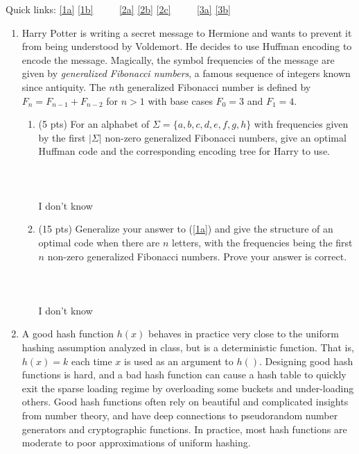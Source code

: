 \documentclass[12pt]{article}
\begin{document}
\renewcommand{\headrulewidth}{0.5pt}
\phantom{Test}

Quick links: \ref{1a} \ref{1b} $\qquad$ \ref{2a} \ref{2b} \ref{2c} $\qquad$ \ref{3a} \ref{3b} 
\vspace{-3mm}

\vspace{-3mm}
\begin{enumerate}
		 
	\item Harry Potter is writing a secret message to Hermione and wants to prevent it from being understood by Voldemort. He decides to use Huffman encoding to encode the message. Magically, the symbol frequencies of the message are given by \textit{generalized Fibonacci numbers}, a famous sequence of integers known since antiquity. The $n$th generalized Fibonacci number is defined by $F_{n} = F_{n-1}+F_{n-2}$ for $n>1$ with base cases $F_{0}=3$ and $F_{1}=4$.
	\begin{enumerate}
	\item (5 pts) \label{1a} For an alphabet of $\Sigma=\{a,b,c,d,e,f,g,h\}$ with frequencies given by the first $|\Sigma|$ non-zero generalized Fibonacci numbers, give an optimal Huffman code and the corresponding encoding tree for Harry to use.
    \\ \\ \\ \\I don't know
    \pagebreak	
    	
	\item (15 pts) \label{1b} Generalize your answer to (\ref{1a}) and give the structure of an optimal code when there are $n$ letters, with the frequencies being the first $n$ non-zero generalized Fibonacci numbers. Prove your answer is correct.
    \\ \\ \\ \\I don't know
    \pagebreak	
    	
	\end{enumerate}



	\item A good hash function $h(x)$ behaves in practice very close to the uniform hashing assumption analyzed in class, but is a deterministic function. That is, $h(x)=k$ each time $x$ is used as an argument to $h()$. Designing good hash functions is hard, and a bad hash function can cause a hash table to quickly exit the sparse loading regime by overloading some buckets and under-loading others. Good hash functions often rely on beautiful and complicated insights from number theory, and have deep connections to pseudorandom number generators and cryptographic functions. In practice, most hash functions are moderate to poor approximations of uniform hashing.
	

\end{enumerate}
\end{document}
